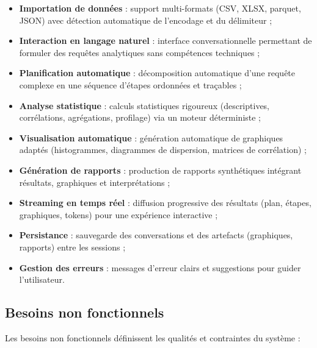 \begin{itemize}
  \item \textbf{Importation de données} : support multi-formats (CSV, XLSX, parquet, JSON) avec détection automatique de l'encodage et du délimiteur ;
  \item \textbf{Interaction en langage naturel} : interface conversationnelle permettant de formuler des requêtes analytiques sans compétences techniques ;
  \item \textbf{Planification automatique} : décomposition automatique d'une requête complexe en une séquence d'étapes ordonnées et traçables ;
  \item \textbf{Analyse statistique} : calculs statistiques rigoureux (descriptives, corrélations, agrégations, profilage) via un moteur déterministe ;
  \item \textbf{Visualisation automatique} : génération automatique de graphiques adaptés (histogrammes, diagrammes de dispersion, matrices de corrélation) ;
  \item \textbf{Génération de rapports} : production de rapports synthétiques intégrant résultats, graphiques et interprétations ;
  \item \textbf{Streaming en temps réel} : diffusion progressive des résultats (plan, étapes, graphiques, tokens) pour une expérience interactive ;
  \item \textbf{Persistance} : sauvegarde des conversations et des artefacts (graphiques, rapports) entre les sessions ;
  \item \textbf{Gestion des erreurs} : messages d'erreur clairs et suggestions pour guider l'utilisateur.
\end{itemize}

\subsection{Besoins non fonctionnels}

Les besoins non fonctionnels définissent les qualités et contraintes du système :

